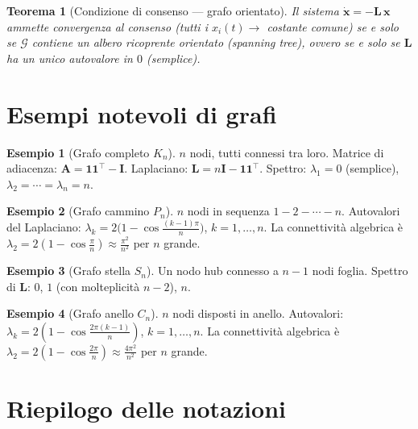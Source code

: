 \documentclass[a4paper,11pt]{article}
\theoremstyle{definition}
\newtheorem{esempio}{Esempio}[section]
\theoremstyle{plain}
\newtheorem{thm}{Teorema}[section]
\theoremstyle{remark}
\newcommand{\mat}[1]{\mathbf{#1}}
\newcommand{\vect}[1]{\bm{#1}}
\newcommand{\ones}{\mathbf{1}}
\begin{document}
\begin{thm}[Condizione di consenso --- grafo orientato]
Il sistema $\dot{\vect{x}} = -\mat{L}\,\vect{x}$ ammette convergenza al consenso
(tutti i $x_i(t) \to $ costante comune) se e solo se $\mathcal{G}$ contiene
un \emph{albero ricoprente orientato} (spanning tree), ovvero se e solo se
$\mat{L}$ ha un unico autovalore in $0$ (semplice).
\end{thm}

\section{Esempi notevoli di grafi}

\begin{esempio}[Grafo completo $K_n$]
$n$ nodi, tutti connessi tra loro. Matrice di adiacenza: $\mat{A} = \ones\ones^\top - \mat{I}$.
Laplaciano: $\mat{L} = n\mat{I} - \ones\ones^\top$.
Spettro: $\lambda_1 = 0$ (semplice), $\lambda_2 = \cdots = \lambda_n = n$.
\end{esempio}

\begin{esempio}[Grafo cammino $P_n$]
$n$ nodi in sequenza $1-2-\cdots-n$.
Autovalori del Laplaciano: $\lambda_k = 2\bigl(1 - \cos\frac{(k-1)\pi}{n}\bigr)$, $k=1,\ldots,n$.
La connettività algebrica è $\lambda_2 = 2(1-\cos\frac{\pi}{n}) \approx \frac{\pi^2}{n^2}$ per $n$ grande.
\end{esempio}

\begin{esempio}[Grafo stella $S_n$]
Un nodo hub connesso a $n-1$ nodi foglia.
Spettro di $\mat{L}$: $0$, $1$ (con molteplicità $n-2$), $n$.
\end{esempio}

\begin{esempio}[Grafo anello $C_n$]
$n$ nodi disposti in anello. Autovalori: $\lambda_k = 2(1 - \cos\frac{2\pi(k-1)}{n})$, $k=1,\ldots,n$.
La connettività algebrica è $\lambda_2 = 2(1-\cos\frac{2\pi}{n}) \approx \frac{4\pi^2}{n^2}$ per $n$ grande.
\end{esempio}

\section{Riepilogo delle notazioni}
\end{document}
